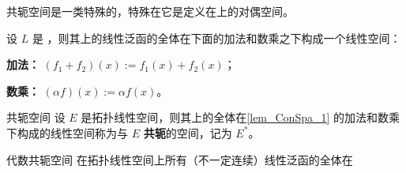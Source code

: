 
共轭空间是一类特殊的，特殊在它是定义在上的对偶空间。

\begin{lemma}{}\label{lem_ConSpa_1}
设 $L$ 是 ，则其上的线性泛函的全体在下面的加法和数乘之下构成一个线性空间：

\textbf{加法：} $(f_1+f_2)(x):=f_1(x)+f_2(x)$；

\textbf{数乘：} $(\alpha f)(x):=\alpha f(x)$。
\end{lemma}

\begin{definition}{共轭空间}
设 $E$ 是拓扑线性空间，则其上的全体在\autoref{lem_ConSpa_1} 的加法和数乘下构成的线性空间称为与 $E$ \textbf{共轭}的空间，记为 $E^*$。
\end{definition}

\begin{definition}{代数共轭空间}
在拓扑线性空间上所有（不一定连续）线性泛函的全体在
\end{definition}



